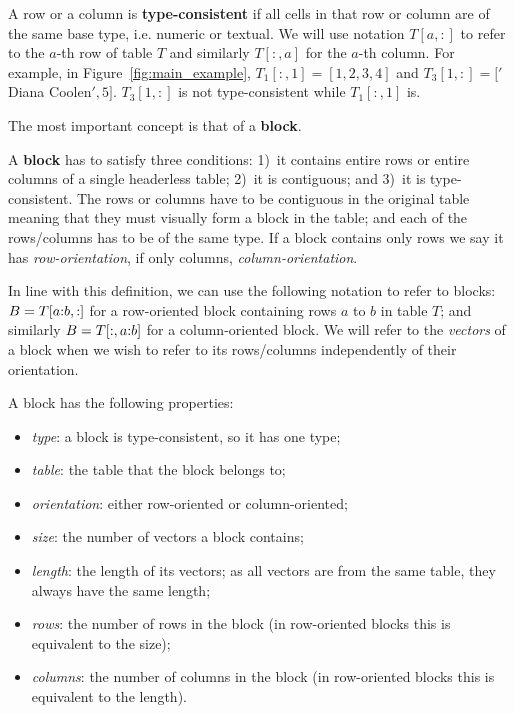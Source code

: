 A row or a column is \textbf{type-consistent} if all cells in that row or column are of the same base type, i.e. numeric or textual.
We will use notation $T[a,{:}]$ to refer to the $a$-th row of table $T$ and similarly $T[{:},a]$ for the $a$-th column.
For example, in Figure~\ref{fig:main_example}, $T_1[:,1] = [1,2,3,4]$ and $T_3[1,:] = ['$Diana Coolen$', 5]$.
$T_3[1, :]$ is not type-consistent while $T_1[:, 1]$ is.

The most important concept is that of a \textbf{block}. 
\begin{definition}
A \textbf{block} has to satisfy three conditions: 1)~it contains entire rows or entire columns of a single headerless table; 2)~it is contiguous; and 3)~it is type-consistent.
The rows or columns have to be contiguous in the original table meaning that they must visually form a block in the table; and each of the rows/columns has to be of the same type. 
If a block contains only rows we say it has \textit{row-orientation}, if only columns, \textit{column-orientation}. 
\end{definition}

In line with this definition, we can use the following notation to refer to blocks: $B = T[a{:}b,:]$ for a row-oriented block containing rows $a$ to $b$ in table $T$; and similarly $B = T[{:},a{:}b]$ for a column-oriented block.
We will refer to the \textit{vectors} of a block when we wish to refer to its rows/columns independently of their orientation.


A block has the following properties:
\begin{itemize}
\item \textit{type}: a block is type-consistent, so it has one type;
\item \textit{table}: the table that the block belongs to;
\item \textit{orientation}: either row-oriented or column-oriented;
\item \textit{size}: the number of vectors a block contains;
\item \textit{length}: the length of its vectors; as all vectors are from the same table, they always have the same length;
\item \textit{rows}: the number of rows in the block
(in row-oriented blocks this is equivalent to the size);
\item \textit{columns}: the number of columns in the block (in row-oriented blocks this is equivalent to the length).
\end{itemize}

